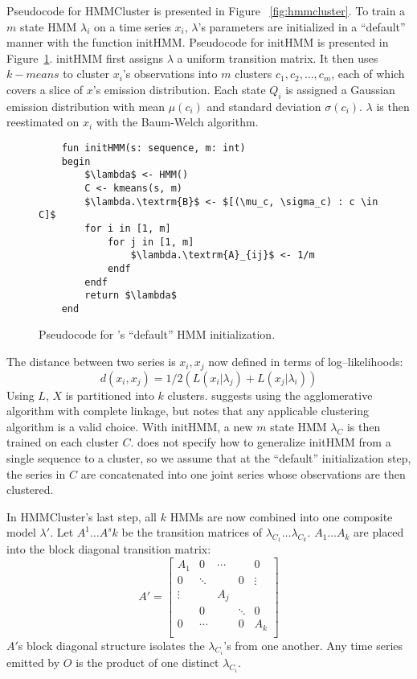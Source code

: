 Pseudocode for HMMCluster is presented in Figure ~\ref{fig:hmmcluster}. To train a $m$ state HMM $\lambda_i$ on a time series $x_i$, $\lambda$'s parameters are initialized in a ``default'' manner with the function initHMM. Pseudocode for initHMM is presented in Figure~\ref{fig:inithmm}. initHMM first assigns $\lambda$ a uniform transition matrix. It then uses $k-means$ to cluster $x_i$'s observations into $m$ clusters $c_1, c_2, \dots,c_m$, each of which covers a slice of $x$'s emission distribution. Each state $Q_i$ is assigned a Gaussian emission distribution with mean $\mu(c_i)$ and standard deviation $\sigma(c_i)$. $\lambda$ is then reestimated on $x_i$ with the Baum-Welch algorithm.
\begin{figure}
	\begin{lstlisting}
	fun initHMM(s: sequence, m: int)
	begin
		$\lambda$ <- HMM()
		C <- kmeans(s, m)
		$\lambda.\textrm{B}$ <- $[(\mu_c, \sigma_c) : c \in C]$
		for i in [1, m]
			for j in [1, m]
				$\lambda.\textrm{A}_{ij}$ <- 1/m
			endf
		endf
		return $\lambda$
	end
	\end{lstlisting}
	\caption{Pseudocode for \citet{smyth}'s ``default'' HMM initialization.}
	\label{fig:inithmm}
\end{figure}
The distance between two series is $x_i, x_j$ now defined in terms of log--likelihoods:
\[d(x_i, x_j) = 1/2(L(x_i|\lambda_j) + L(x_j|\lambda_i))\]
Using $L$, $X$ is partitioned into $k$ clusters. \citeauthor{smyth} suggests using the agglomerative algorithm with complete linkage, but notes that any applicable clustering algorithm is a valid choice. With initHMM, a new $m$ state HMM $\lambda_{C}$ is then trained on each cluster $C$. \citeauthor{smyth} does not specify how to generalize initHMM from a single sequence to a cluster, so we assume that at the ``default'' initialization step, the series in $C$ are concatenated into one joint series whose observations are then clustered.

In HMMCluster's last step, all $k$ HMMs are now combined into one composite model $\lambda'$. Let $A^1 \dots A^sk$ be the transition matrices of $\lambda_{C_1} \dots \lambda_{C_k}$. $A_1 \dots A_k$ are placed into the block diagonal transition matrix:
\[A' =
\begin{bmatrix}
A_1 		& 0 		 & \cdots	& 			& 0			\\
0			& \ddots	 & 			& 0			& \vdots	\\
\vdots		&			 & A_j		&			&			\\
			& 0			 & 			& \ddots	& 0			\\
0			& \cdots 	 & 			& 0 		& A_k		\\
\end{bmatrix}
\]
$A'$s block diagonal structure isolates the $\lambda_{C_i}$'s from one another. Any time series emitted by $O$ is the product of one distinct $\lambda_{C_i}$.

